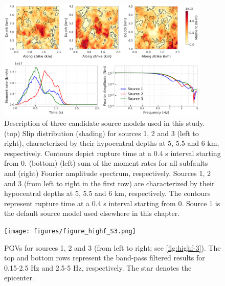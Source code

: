 \begin{figure}[!ht]
  \includegraphics[width=0.9\textwidth,height=0.9\textheight,keepaspectratio]{figures/figure_highf_S2.pdf}
  \caption{Description of three candidate source models used in this study. (top) Slip distribution (shading) for sources 1, 2 and 3 (left to right), characterized by their hypocentral depths at 5, 5.5 and 6 km, respectively. Contours depict rupture time at a 0.4 s interval starting from 0. (bottom) (left) sum of the moment rates for all subfaults and (right) Fourier amplitude spectrum, respectively.  Sources 1, 2 and 3 (from left to right in the first row) are characterized by their hypocentral depths at 5, 5.5 and 6 km, respectively. The contours represent rupture time at a 0.4 s interval starting from 0. Source 1 is the default source model used elsewhere in this chapter.}
  \label{fig:highf-A2}
\end{figure}
\clearpage

\begin{figure}[!ht]
  \texttt{[image: figures/figure\_highf\_S3.png]}
  \caption{PGVs for sources 1, 2 and 3 (from left to right; see \cref{fig:highf-3}). The top and bottom rows represent the band-pass filtered results for 0.15-2.5 Hz and 2.5-5 Hz, respectively. The star denotes the epicenter.}
  \label{fig:highf-A3}
\end{figure}
\clearpage


